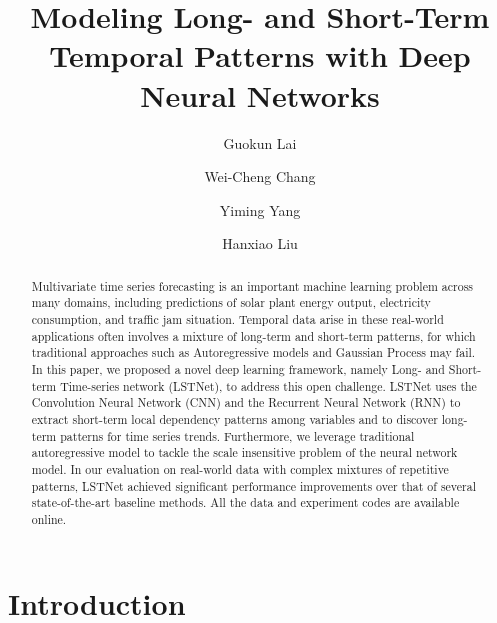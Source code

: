 \documentclass[sigconf]{acmart}
\begin{document}
\title{Modeling Long- and Short-Term Temporal Patterns with Deep Neural Networks}

\author{Guokun Lai}

\author{Wei-Cheng Chang}

\author{Yiming Yang}

\author{Hanxiao Liu}

\begin{abstract}
Multivariate time series forecasting is an important machine learning problem across many domains, including predictions of solar plant energy output, electricity consumption, and traffic jam situation. Temporal data arise in these real-world applications often involves a mixture of long-term and short-term patterns, for which traditional approaches such as Autoregressive models and Gaussian Process may fail. In this paper, we proposed a novel deep learning framework, namely Long- and Short-term Time-series network (LSTNet), to address this open challenge. LSTNet uses the Convolution Neural Network (CNN) and the Recurrent Neural Network (RNN) to extract short-term local dependency patterns among variables and to discover long-term patterns for time series trends. Furthermore, we leverage traditional autoregressive model to tackle the scale insensitive problem of the neural network model. In our evaluation on real-world data with complex mixtures of repetitive patterns, LSTNet achieved significant performance improvements over that of several state-of-the-art baseline methods. All the data and experiment codes are available online.

\end{abstract}


\maketitle

\section{Introduction}
\label{sec:intro}
\end{document}
